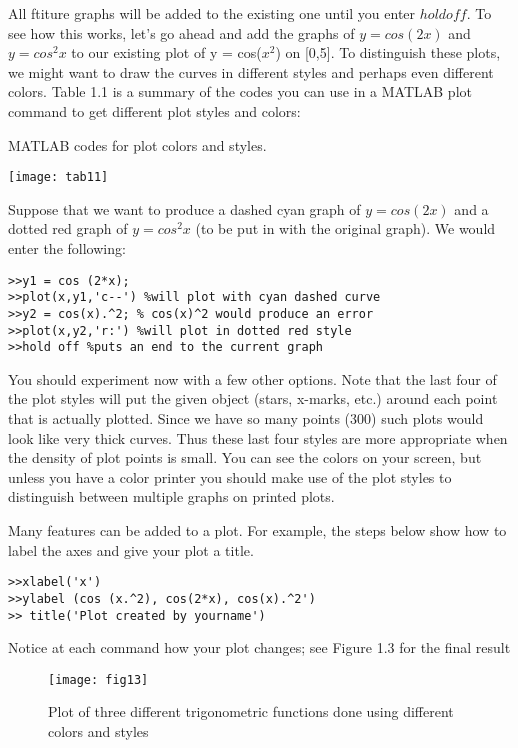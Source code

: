 \documentclass[../main.tex]{subfiles}
\begin{document}
All ftiture graphs will be added to the existing one until you enter $hold off$. To
see how this works, let's go ahead and add the graphs of
$y = cos(2x)$ and $y = cos^2x$ to our existing plot of y = cos($x^2$) on [0,5]. To
distinguish these plots, we might want to draw the curves in different styles and
perhaps even different colors. Table 1.1 is a summary of the codes you can use in
a MATLAB plot command to get different plot styles and colors: 

\begin{table}[H]
\caption{ MATLAB codes for plot colors and styles.  }
\centering
\texttt{[image: tab11]}
\label{tab:tab_1_1}
\end{table}

Suppose that we want to produce a dashed cyan graph of $y = cos(2x)$ and a
dotted red graph of $y = cos^2x$ (to be put in with the original graph). We would
enter the following:

\begin{verbatim}
>>y1 = cos (2*x);
>>plot(x,y1,'c--') %will plot with cyan dashed curve
>>y2 = cos(x).^2; % cos(x)^2 would produce an error
>>plot(x,y2,'r:') %will plot in dotted red style
>>hold off %puts an end to the current graph
\end{verbatim}

\noindent You should experiment now with a few other options. Note that the last four of
the plot styles will put the given object (stars, x-marks, etc.) around each point that
is actually plotted. Since we have so many points (300) such plots would look like
very thick curves. Thus these last four styles are more appropriate when the
density of plot points is small. You can see the colors on your screen, but unless you have a color printer you should make use of the plot styles to distinguish
between multiple graphs on printed plots.

Many features can be added to a plot. For example, the steps below show how to
label the axes and give your plot a title. 

\begin{verbatim}
>>xlabel('x')
>>ylabel (cos (x.^2), cos(2*x), cos(x).^2') 
>> title('Plot created by yourname') 
\end{verbatim}

Notice at each command how your plot changes; see Figure 1.3 for the final result

\begin{figure}[H]
\centering
\texttt{[image: fig13]}
\caption{Plot of three different trigonometric functions done using different colors
and styles }
\label{fig:fig_1_3}
\end{figure}
\end{document}
